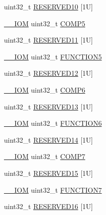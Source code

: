 \begin{DoxyCompactItemize}
\item 
uint32\+\_\+t \hyperlink{struct_d_w_t___type_abc7714b71efedf71fcae52db7f49afb9}{R\+E\+S\+E\+R\+V\+E\+D10} \mbox{[}1\+U\mbox{]}
\item 
\hyperlink{core__sc300_8h_ab6caba5853a60a17e8e04499b52bf691}{\+\_\+\+\_\+\+I\+OM} uint32\+\_\+t \hyperlink{struct_d_w_t___type_a07667ec9dd833ecab52bf2cf802d9acb}{C\+O\+M\+P5}
\item 
uint32\+\_\+t \hyperlink{struct_d_w_t___type_a8ba804cd80450397994240a0630f4f88}{R\+E\+S\+E\+R\+V\+E\+D11} \mbox{[}1\+U\mbox{]}
\item 
\hyperlink{core__sc300_8h_ab6caba5853a60a17e8e04499b52bf691}{\+\_\+\+\_\+\+I\+OM} uint32\+\_\+t \hyperlink{struct_d_w_t___type_a2f33ef0ce606e4850ecde8d044f7bb5b}{F\+U\+N\+C\+T\+I\+O\+N5}
\item 
uint32\+\_\+t \hyperlink{struct_d_w_t___type_a472188cd06ad33e60a90b1dda59b5bbb}{R\+E\+S\+E\+R\+V\+E\+D12} \mbox{[}1\+U\mbox{]}
\item 
\hyperlink{core__sc300_8h_ab6caba5853a60a17e8e04499b52bf691}{\+\_\+\+\_\+\+I\+OM} uint32\+\_\+t \hyperlink{struct_d_w_t___type_a1256ac92acb94add255ff31aca31070d}{C\+O\+M\+P6}
\item 
uint32\+\_\+t \hyperlink{struct_d_w_t___type_a50ae92e4bb6a6cc6aee56193030bce29}{R\+E\+S\+E\+R\+V\+E\+D13} \mbox{[}1\+U\mbox{]}
\item 
\hyperlink{core__sc300_8h_ab6caba5853a60a17e8e04499b52bf691}{\+\_\+\+\_\+\+I\+OM} uint32\+\_\+t \hyperlink{struct_d_w_t___type_aa8f49a707a5d85cf554b9bef54c19380}{F\+U\+N\+C\+T\+I\+O\+N6}
\item 
uint32\+\_\+t \hyperlink{struct_d_w_t___type_a40bf22efd6d393b66c0b02e03e6083fc}{R\+E\+S\+E\+R\+V\+E\+D14} \mbox{[}1\+U\mbox{]}
\item 
\hyperlink{core__sc300_8h_ab6caba5853a60a17e8e04499b52bf691}{\+\_\+\+\_\+\+I\+OM} uint32\+\_\+t \hyperlink{struct_d_w_t___type_a46db6f5289d840f0b9886ae598352452}{C\+O\+M\+P7}
\item 
uint32\+\_\+t \hyperlink{struct_d_w_t___type_afd3951dec40fb4ada4efc31d958764a9}{R\+E\+S\+E\+R\+V\+E\+D15} \mbox{[}1\+U\mbox{]}
\item 
\hyperlink{core__sc300_8h_ab6caba5853a60a17e8e04499b52bf691}{\+\_\+\+\_\+\+I\+OM} uint32\+\_\+t \hyperlink{struct_d_w_t___type_ababf5d870650c4a480302b65bdb66741}{F\+U\+N\+C\+T\+I\+O\+N7}
\item 
uint32\+\_\+t \hyperlink{struct_d_w_t___type_a34e42d65754ab1a3f2db4363254f911f}{R\+E\+S\+E\+R\+V\+E\+D16} \mbox{[}1\+U\mbox{]}
\item 

\end{DoxyCompactItemize}
